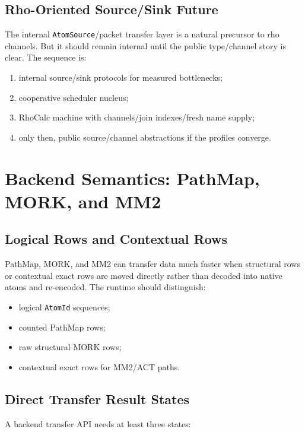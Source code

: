 \documentclass[11pt]{article}
\newcommand{\PathMap}{PathMap}
\newcommand{\MORK}{MORK}
\newcommand{\MM}{MM2}
\newcommand{\RhoCalc}{RhoCalc}
\newcommand{\AtomSource}{\texttt{AtomSource}}
\begin{document}
\subsection{Rho-Oriented Source/Sink Future}

The internal \AtomSource{}/packet transfer layer is a natural precursor to rho channels.  But it should remain internal until the public type/channel story is clear.  The sequence is:

\begin{enumerate}[leftmargin=*]
  \item internal source/sink protocols for measured bottlenecks;
  \item cooperative scheduler nucleus;
  \item \RhoCalc{} machine with channels/join indexes/fresh name supply;
  \item only then, public source/channel abstractions if the profiles converge.
\end{enumerate}

\section{Backend Semantics: PathMap, MORK, and MM2}

\subsection{Logical Rows and Contextual Rows}

\PathMap{}, \MORK{}, and \MM{} can transfer data much faster when structural rows or contextual exact rows are moved directly rather than decoded into native atoms and re-encoded.  The runtime should distinguish:

\begin{itemize}[leftmargin=*]
  \item logical \texttt{AtomId} sequences;
  \item counted \PathMap{} rows;
  \item raw structural \MORK{} rows;
  \item contextual exact rows for \MM{}/ACT paths.
\end{itemize}

\subsection{Direct Transfer Result States}

A backend transfer API needs at least three states:
\end{document}
